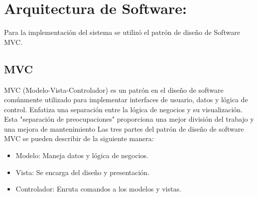 \section{Arquitectura de Software:}
    Para la implementación del sistema se utilizó el patrón de diseño de Software MVC. 
    \subsection{MVC}
    MVC (Modelo-Vista-Controlador) es un patrón en el diseño de software comúnmente utilizado para implementar interfaces de usuario, datos y lógica de control. Enfatiza una separación entre la lógica de negocios y su visualización. Esta "separación de preocupaciones" proporciona una mejor división del trabajo y una mejora de mantenimiento
    Las tres partes del patrón de diseño de software MVC se pueden describir de la siguiente manera:
    \begin{itemize}
        \item Modelo: Maneja datos y lógica de negocios.
        \item Vista: Se encarga del diseño y presentación.
        \item Controlador: Enruta comandos a los modelos y vistas.
    \end{itemize}

    
